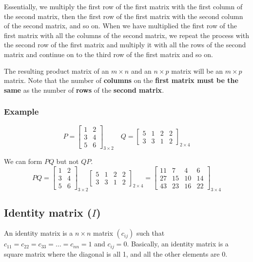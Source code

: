 \documentclass[11pt]{article}
\begin{document}
Essentially, we multiply the first row of the first matrix with the first column of the second matrix, then the first row of the first matrix with the second column of the second matrix, and so on. When we have multiplied the first row of the first matrix with all the columns of the second matrix, we repeat the process with the second row of the first matrix and multiply it with all the rows of the second matrix and continue on to the third row of the first matrix and so on.

The resulting product matrix of an \(m \times n\) and an \(n \times p\) matrix will be an \(m \times p\) matrix. Note that the number of \textbf{columns} on the \textbf{first matrix must be the same} as the number of \textbf{rows} of the \textbf{second matrix}.

\subsubsection{Example}
\label{sec:org660603e}
\begin{displaymath}
P = \begin{bmatrix}
1 & 2 \\
3 & 4 \\
5 & 6
\end{bmatrix}_{3 \times 2} \quad Q = \begin{bmatrix}
5 & 1 & 2 & 2 \\
3 & 3 & 1 & 2
\end{bmatrix}_{2 \times 4}
\end{displaymath}

We can form \(PQ\) but not \(QP\).
\begin{displaymath}
PQ = \begin{bmatrix}
1 & 2 \\
3 & 4 \\
5 & 6
\end{bmatrix}_{3 \times 2} \begin{bmatrix}
5 & 1 & 2 & 2 \\
3 & 3 & 1 & 2
\end{bmatrix}_{2 \times 4} = \begin{bmatrix}
11 & 7 & 4 & 6 \\
27 & 15 & 10 & 14 \\
43 & 23 & 16 & 22
\end{bmatrix}_{3 \times 4}
\end{displaymath}

\subsection{Identity matrix (\(I\))}
\label{sec:org4abac16}
An identity matrix is a \(n \times n\) matrix \((c_{ij})\) such that \(c_{11} = c_{22} = c_{33} = \ldots = c_{nn} = 1\) and \(c_{ij} = 0\). Basically, an identity matrix is a square matrix where the diagonal is all 1, and all the other elements are 0.
\end{document}
